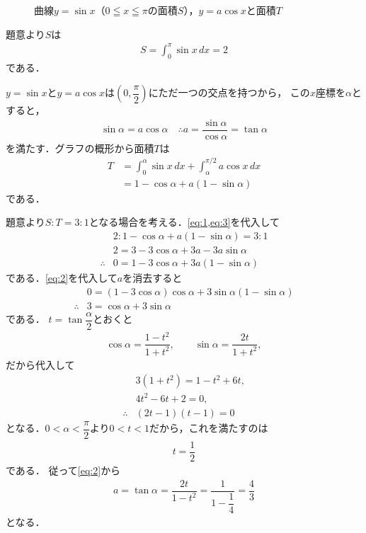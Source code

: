 \documentclass[../../main.tex]{subfiles}
\begin{document}
\begin{figure}[htb]
  \caption{曲線$y=\sin x$（$0\leqq x\leqq \pi$の面積$S$），$y=a\cos x$と面積$T$}
  \label{fig:sin_cos_regions}
\end{figure}

題意より$S$は
\begin{align}
  S=\int_0^\pi\sin x\,dx=2 \label{eq:1}
\end{align}
である．

$y=\sin x$と$y=a\cos x$は$(0,\dfrac{\pi}{2})$にただ一つの交点を持つから，
この$x$座標を$\alpha$とすると，
\begin{align}
  \sin\alpha=a\cos\alpha
  \quad\therefore
  a = \dfrac{\sin\alpha}{\cos\alpha} = \tan\alpha \label{eq:2}
\end{align}
を満たす．グラフの概形から面積$T$は
\begin{align}
  T
  &=\int_0^\alpha\sin x\,dx+\int_\alpha^{\pi/2}a\cos x\,dx\\
  &=1-\cos\alpha+a(1-\sin\alpha) \label{eq:3}
\end{align}
である．

題意より$S:T=3:1$となる場合を考える．\cref{eq:1,eq:3}を代入して
\begin{align}
  & 2: 1-\cos\alpha +a(1-\sin\alpha) = 3:1 \\
  & 2 = 3-3\cos\alpha + 3a - 3a\sin\alpha \\
  \therefore
  & 0=1-3\cos\alpha+3a(1-\sin\alpha)
\end{align}
である．\cref{eq:2}を代入して$a$を消去すると
\begin{align}
  & 0=(1-3\cos\alpha)\cos\alpha+3\sin\alpha(1-\sin\alpha) \\
  \therefore
  & 3=\cos\alpha+3\sin\alpha
\end{align}
である．
$t=\tan\dfrac{\alpha}{2}$とおくと
\begin{align}
  \cos\alpha=\dfrac{1-t^2}{1+t^2},\qquad \sin\alpha=\dfrac{2t}{1+t^2},
\end{align}
だから代入して
\begin{align}
  & 3(1+t^2)=1-t^2+6t,\\
  & 4t^2-6t+2=0,\\
  \therefore
  & (2t-1)(t-1)=0
\end{align}
となる．$0<\alpha<\dfrac{\pi}{2}$より$0<t<1$だから，これを満たすのは
\begin{align}
  t=\dfrac{1}{2} \label{eq:4}
\end{align}
である．
従って\cref{eq:2}から
\begin{align}
  a=\tan\alpha=\dfrac{2t}{1-t^2}=\dfrac{1}{1-\dfrac{1}{4}}=\dfrac{4}{3}
\end{align}
となる．
\end{document}
